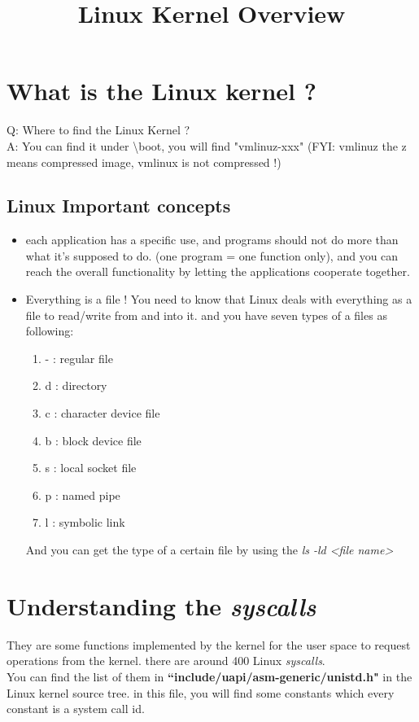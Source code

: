 \documentclass{article}
\title{\textbf{Linux Kernel Overview}}
\author{}
\date{}
\begin{document}
\maketitle
\tableofcontents{}
\section{What is the Linux kernel ?}

Q: Where to find the Linux Kernel ?\\
A: You can find it under \textbackslash boot, you will find "vmlinuz-xxx" (FYI: vmlinuz the z means compressed image, vmlinux is not compressed !)

\subsection {Linux Important concepts}
\begin{itemize}
    \item each application has a specific use, and programs should not do more than what it's supposed to do. (one program = one function only), and you can reach the overall functionality by letting the applications cooperate together.
    \item Everything is a file !
    You need to know that Linux deals with everything as a file to read/write from and into it. and you have seven types of a files as following:
    \begin{enumerate}
        \item - : regular file
        \item d : directory
        \item c : character device file
        \item b : block device file
        \item s : local socket file
        \item p : named pipe
        \item l : symbolic link
    \end{enumerate}
    And you can get the type of a certain file by using the \textit{ls -ld <file name>}
    

\end{itemize}

\section{Understanding the \textit{syscalls}}
They are some functions implemented by the kernel for the user space to request operations from the kernel. there are around 400 Linux \textit{syscalls}.\\
You can find the list of them in \textbf{``include/uapi/asm-generic/unistd.h"} in the Linux kernel source tree. in this file, you will find some constants which every constant is a system call id.
\end{document}
